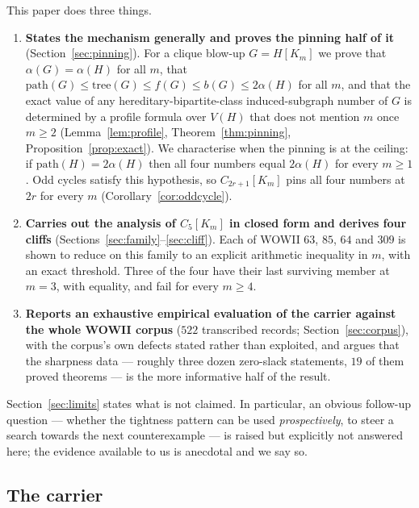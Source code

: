 \documentclass[10pt,a4paper]{article}
\theoremstyle{plain}
\theoremstyle{definition}
\newcommand{\ind}{\alpha}
\newcommand{\forestnum}{f}
\newcommand{\bipnum}{b}
\newcommand{\treenum}{\mathrm{tree}}
\newcommand{\pathnum}{\mathrm{path}}
\newcommand{\blow}[2]{#1[K_{#2}]}
\begin{document}
This paper does three things.

\begin{enumerate}
\item \textbf{States the mechanism generally and proves the pinning half of it}
(Section~\ref{sec:pinning}). For a clique blow-up $G = H[K_m]$ we prove that
$\ind(G) = \ind(H)$ for all $m$, that
$\pathnum(G) \le \treenum(G) \le \forestnum(G) \le \bipnum(G) \le 2\ind(H)$ for all $m$, and
that the exact value of any hereditary-bipartite-class induced-subgraph number of $G$ is
determined by a profile formula over $V(H)$ that does not mention $m$ once $m \ge 2$
(Lemma~\ref{lem:profile}, Theorem~\ref{thm:pinning}, Proposition~\ref{prop:exact}). We
characterise when the pinning is at the ceiling: if $\pathnum(H) = 2\ind(H)$ then all four
numbers equal $2\ind(H)$ for every $m \ge 1$. Odd cycles satisfy this hypothesis, so
$C_{2r+1}[K_m]$ pins all four numbers at $2r$ for every $m$
(Corollary~\ref{cor:oddcycle}).

\item \textbf{Carries out the analysis of $\blow{C_5}{m}$ in closed form and derives four
cliffs} (Sections~\ref{sec:family}--\ref{sec:cliff}). Each of WOWII $63$, $85$, $64$ and $309$
is shown to reduce on this family to an explicit arithmetic inequality in $m$, with an exact
threshold. Three of the four have their last surviving member at $m = 3$, with equality, and
fail for every $m \ge 4$.

\item \textbf{Reports an exhaustive empirical evaluation of the carrier against the whole WOWII
corpus} ($522$ transcribed records; Section~\ref{sec:corpus}), with the corpus's own defects
stated rather than exploited, and argues that the sharpness data --- roughly three dozen
zero-slack statements, $19$ of them proved theorems --- is the more informative half of the
result.
\end{enumerate}

Section~\ref{sec:limits} states what is not claimed. In particular, an obvious follow-up
question --- whether the tightness pattern can be used \emph{prospectively}, to steer a search
towards the next counterexample --- is raised but explicitly not answered here; the evidence
available to us is anecdotal and we say so.

\subsection{The carrier}
\end{document}
